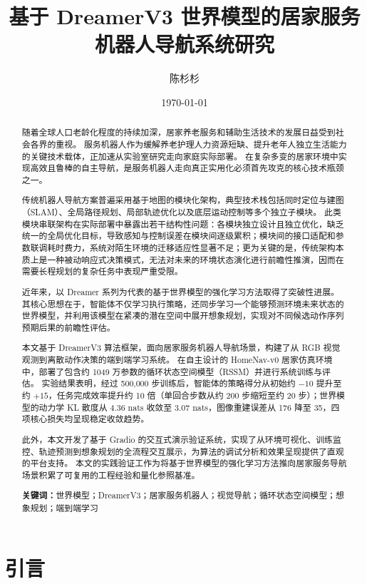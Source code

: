 \documentclass[12pt,a4paper]{ctexart}
\title{\textbf{基于 DreamerV3 世界模型的居家服务机器人导航系统研究}}
\author{陈杉杉}
\date{\today}
\begin{document}
\maketitle

\begin{abstract}
随着全球人口老龄化程度的持续加深，居家养老服务和辅助生活技术的发展日益受到社会各界的重视。
服务机器人作为缓解养老护理人力资源短缺、提升老年人独立生活能力的关键技术载体，正加速从实验室研究走向家庭实际部署。
在复杂多变的居家环境中实现高效且鲁棒的自主导航，是服务机器人走向真正实用化必须首先攻克的核心技术瓶颈之一。

传统机器人导航方案普遍采用基于地图的模块化架构，典型技术栈包括同时定位与建图（SLAM）、全局路径规划、局部轨迹优化以及底层运动控制等多个独立子模块。
此类模块串联架构在实际部署中暴露出若干结构性问题：各模块独立设计且独立优化，缺乏统一的全局优化目标，导致感知与控制误差在模块间逐级累积；模块间的接口适配和参数联调耗时费力，系统对陌生环境的迁移适应性显著不足；更为关键的是，传统架构本质上是一种被动响应式决策模式，无法对未来的环境状态演化进行前瞻性推演，因而在需要长程规划的复杂任务中表现严重受限。

近年来，以 Dreamer 系列为代表的基于世界模型的强化学习方法取得了突破性进展。
其核心思想在于，智能体不仅学习执行策略，还同步学习一个能够预测环境未来状态的世界模型，并利用该模型在紧凑的潜在空间中展开想象规划，实现对不同候选动作序列预期后果的前瞻性评估。

本文基于 DreamerV3 算法框架，面向居家服务机器人导航场景，构建了从 RGB 视觉观测到离散动作决策的端到端学习系统。
在自主设计的 HomeNav-v0 居家仿真环境中，部署了包含约 1049 万参数的循环状态空间模型（RSSM）并进行系统训练与评估。
实验结果表明，经过 500,000 步训练后，智能体的策略得分从初始约 $-10$ 提升至约 $+15$，任务完成效率提升约 10 倍（单回合步数从约 200 步缩短至约 20 步）；世界模型的动力学 KL 散度从 4.36 nats 收敛至 3.07 nats，图像重建误差从 176 降至 35，四项核心损失均呈现稳定收敛趋势。

此外，本文开发了基于 Gradio 的交互式演示验证系统，实现了从环境可视化、训练监控、轨迹预测到想象规划的全流程交互展示，为算法的调试分析和效果呈现提供了直观的平台支持。
本文的实践验证工作为将基于世界模型的强化学习方法推向居家服务导航场景积累了可复用的工程经验和量化参照基准。

\noindent\textbf{关键词：}世界模型；DreamerV3；居家服务机器人；视觉导航；循环状态空间模型；想象规划；端到端学习
\end{abstract}

\section{引言}
\end{document}
